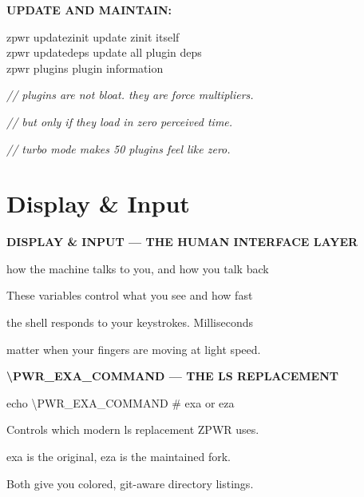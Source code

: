 \documentclass[11pt,a4paper,twoside]{book}
\begin{document}
\vspace{12pt}
{\bfseries\color{neonyellow} UPDATE AND MAINTAIN:}\vspace{4pt}

\begin{codebox}
zpwr updatezinit        update zinit itself\\
zpwr updatedeps          update all plugin deps\\
zpwr plugins             plugin information\\
\end{codebox}

{\small\itshape\color{dimtext} // plugins are not bloat. they are force multipliers.}

{\small\itshape\color{dimtext} // but only if they load in zero perceived time.}

{\small\itshape\color{dimtext} // turbo mode makes 50 plugins feel like zero.}


\vspace{16pt}

\section{Display \& Input}


\vspace{10pt}
{\large\bfseries\color{neoncyan} DISPLAY \& INPUT — THE HUMAN INTERFACE LAYER}\vspace{6pt}

how the machine talks to you, and how you talk back

These variables control what you see and how fast

the shell responds to your keystrokes. Milliseconds

matter when your fingers are moving at light speed.


\vspace{12pt}
{\bfseries\color{neonyellow} \textbackslash{}PWR\_EXA\_COMMAND — THE LS REPLACEMENT}\vspace{4pt}

\begin{codebox}
echo \textbackslash{}PWR\_EXA\_COMMAND   \# exa or eza\\
\end{codebox}

Controls which modern ls replacement ZPWR uses.

exa is the original, eza is the maintained fork.

Both give you colored, git-aware directory listings.
\end{document}

